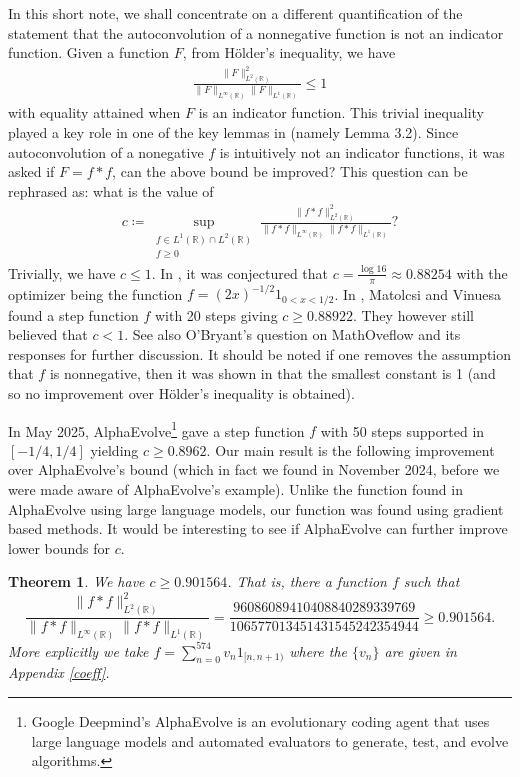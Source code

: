 \documentclass[reqno, 11pt]{amsart}
\newcommand{\R}[0]{\mathbb{R}}
\newcommand{\st}[1]{\substack{#1}}
\newcommand{\nms}[1]{\| #1 \|}
\newtheorem{thm}{Theorem}
\theoremstyle{remark}
\begin{document}
In this short note, we shall concentrate on a different quantification
of the statement that the autoconvolution of a nonnegative function is not an indicator function.
Given a function $F$, from H\"{o}lder's inequality, we have
\begin{align*}
\frac{\nms{F}_{L^{2}(\R)}^{2}}{\nms{F}_{L^{\infty}(\R)}\nms{F}_{L^{1}(\R)}} \leq 1
\end{align*}
with equality attained when $F$ is an indicator function. 
This trivial inequality played a key role in one of the key lemmas
in \cite{MartinOBryant} (namely Lemma 3.2). Since autoconvolution of a nonegative $f$ is intuitively not an indicator functions, it was asked if $F = f \ast f$, can the above bound be improved? 
This question can be rephrased as: what is the value of
\begin{align}\label{target}
c \coloneqq \sup_{\st{f \in L^{1}(\R) \cap L^{2}(\R)\\ f \geq 0}}\frac{\nms{f \ast f}_{L^{2}(\R)}^{2}}{\nms{f \ast f}_{L^{\infty}(\R)}\nms{f \ast f}_{L^{1}(\R)}}?
\end{align}
Trivially, we have $c \leq 1$.
In \cite[Section 5]{MartinOBryant}, it was conjectured that $c = \frac{\log 16}{\pi} \approx 0.88254$ with the optimizer being the function $f = (2x)^{-1/2}1_{0 < x < 1/2}$. 
In \cite{MatolcsiVinuesa}, Matolcsi and Vinuesa found a step function $f$ with 20 steps
giving $c \geq 0.88922$. They however still believed that
$c < 1$.
See also O'Bryant's question on MathOveflow \cite{MathOverflow} and its
responses for
further discussion.
It should be noted if one removes the assumption that $f$ is nonnegative, then it was shown in \cite[Section 5]{deDiosPontMadrid} that the smallest constant is 1 (and so no improvement over H\"{o}lder's inequality is obtained).

In May 2025, AlphaEvolve\footnote{Google Deepmind's AlphaEvolve is an evolutionary coding agent that uses large language models and automated evaluators to generate, test, and evolve algorithms.} \cite{AlphaEvolve} gave a
step function $f$ with 50 steps supported in $[-1/4,1/4]$ yielding $c \geq 0.8962$. 
Our main result is the following improvement over AlphaEvolve's bound (which in fact
we found in November 2024, before we were made aware of AlphaEvolve's example).
Unlike the function found in AlphaEvolve using large language models,
our function was found using gradient based methods.
It would be interesting to see if AlphaEvolve can further improve
lower bounds for $c$.

\begin{thm}\label{main}
We have $c \geq  0.901564$.
That is, there a function $f$ such that
$$\frac{\nms{f \ast f}_{L^{2}(\R)}^{2}}{\nms{f \ast f}_{L^{\infty}(\R)}\nms{f \ast f}_{L^{1}(\R)}} = \frac{96086089410408840289339769}{106577013451431545242354944} \geq 0.901564.$$
More explicitly we take $f = \sum_{n = 0}^{574}v_{n}1_{[n, n + 1)}$ where the $\{v_n\}$ are given in
Appendix \ref{coeff}.
\end{thm}
\end{document}
